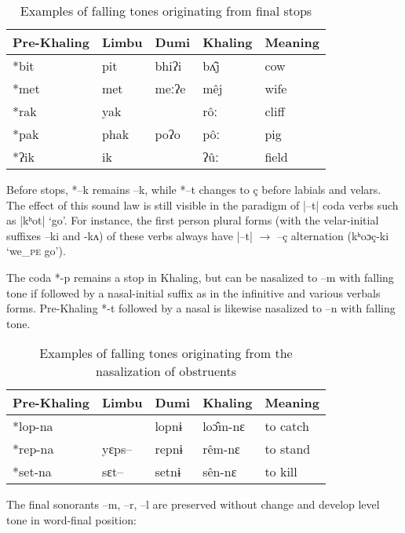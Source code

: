 \documentclass[oldfontcommands,oneside,a4paper,11pt]{article}
\newcommand{\ipa}[1]{{\phon \mbox{#1}}} %
\begin{document}
\begin{table}[H]
\caption{Examples of falling tones originating from final stops} \centering \label{tab:fall.stop}
\begin{tabular}{lllll}
\toprule
Pre-Khaling	&Limbu	&Dumi	&Khaling	&Meaning\\
\midrule
\ipa{*bit}	& \ipa{pit} &	\ipa{bhiʔi}	 & \ipa{bʌ̂j} &	cow\\
\ipa{*met} &	\ipa{met}	& \ipa{meːʔe} &	\ipa{mêj} &	wife\\
\ipa{*rak}	& \ipa{yak}	& &	\ipa{rôː}	& cliff \\
\ipa{*pak} &	\ipa{phak}	& \ipa{poʔo}	& \ipa{pôː}	& pig\\
\ipa{*ʔik}	& \ipa{ik}	& &	\ipa{ʔûː}	& field\\
\bottomrule
\end{tabular}
\end{table}
 
Before stops, \ipa{*--k} remains \ipa{--k}, while \ipa{*--t} changes to \ipa{ç} before labials and velars. The effect of this sound law  is still visible in the paradigm of  |--t| coda verbs such as |kʰot| `go'. For instance, the first person plural forms (with the velar-initial suffixes \ipa{--ki} and \ipa{-kʌ}) of these verbs always have |--t| $\rightarrow$ \ipa{--ç} alternation  (\ipa{kʰoɔç-ki} `we_{\textsc{pe}} go').

The coda \ipa{*-p} remains a stop in Khaling, but can be nasalized to \ipa{–m} with falling tone if followed by a nasal-initial suffix as in the infinitive and various verbals forms. Pre-Khaling \ipa{*-t} followed by a nasal is likewise nasalized to \ipa{--n} with falling tone.
\begin{table}[H]
\caption{Examples of falling tones originating from the nasalization of obstruents} \centering
\begin{tabular}{lllll}
\toprule
Pre-Khaling	&Limbu	&Dumi	&Khaling	&Meaning\\
\midrule
\ipa{*lop-na}	& & \ipa{lopnɨ}	 & \ipa{loɔ̂m-nɛ}	&to catch\\
\ipa{*rep-na}	&\ipa{yɛps--} & \ipa{repnɨ	}& \ipa{rêm-nɛ}	&to stand\\
\ipa{*set-na}	&  \ipa{sɛt--}& \ipa{setnɨ	}& \ipa{sên-nɛ}	&to kill\\
\bottomrule
\end{tabular}
\end{table}

The final sonorants \ipa{--m}, \ipa{--r}, \ipa{--l} are preserved without change and develop level tone in word-final position:
\end{document}
